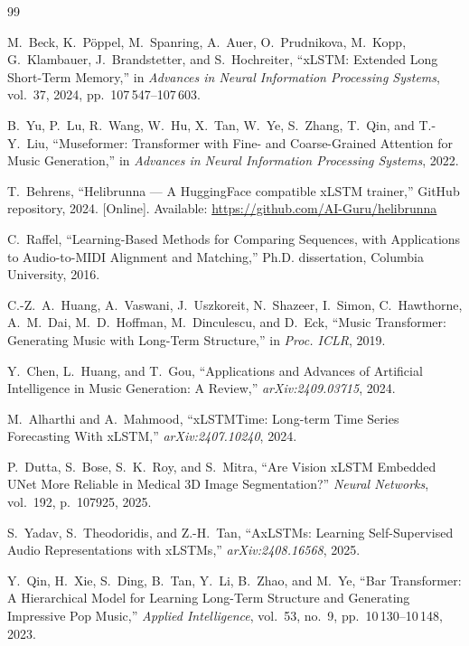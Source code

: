 \documentclass[conference]{IEEEtran}
\begin{document}

\begin{thebibliography}{99}

M.~Beck, K.~P\"{o}ppel, M.~Spanring, A.~Auer, O.~Prudnikova, M.~Kopp, G.~Klambauer, J.~Brandstetter, and S.~Hochreiter, ``xLSTM: Extended Long Short-Term Memory,'' in \emph{Advances in Neural Information Processing Systems}, vol.~37, 2024, pp.~107\,547--107\,603.

B.~Yu, P.~Lu, R.~Wang, W.~Hu, X.~Tan, W.~Ye, S.~Zhang, T.~Qin, and T.-Y.~Liu, ``Museformer: Transformer with Fine- and Coarse-Grained Attention for Music Generation,'' in \emph{Advances in Neural Information Processing Systems}, 2022.

T.~Behrens, ``Helibrunna --- A HuggingFace compatible xLSTM trainer,'' GitHub repository, 2024. [Online]. Available: \url{https://github.com/AI-Guru/helibrunna}

C.~Raffel, ``Learning-Based Methods for Comparing Sequences, with Applications to Audio-to-MIDI Alignment and Matching,'' Ph.D. dissertation, Columbia University, 2016.

C.-Z.~A.~Huang, A.~Vaswani, J.~Uszkoreit, N.~Shazeer, I.~Simon, C.~Hawthorne, A.~M.~Dai, M.~D.~Hoffman, M.~Dinculescu, and D.~Eck, ``Music Transformer: Generating Music with Long-Term Structure,'' in \emph{Proc. ICLR}, 2019.

Y.~Chen, L.~Huang, and T.~Gou, ``Applications and Advances of Artificial Intelligence in Music Generation: A Review,'' \emph{arXiv:2409.03715}, 2024.

M.~Alharthi and A.~Mahmood, ``xLSTMTime: Long-term Time Series Forecasting With xLSTM,'' \emph{arXiv:2407.10240}, 2024.

P.~Dutta, S.~Bose, S.~K.~Roy, and S.~Mitra, ``Are Vision xLSTM Embedded UNet More Reliable in Medical 3D Image Segmentation?'' \emph{Neural Networks}, vol.~192, p.~107925, 2025.

S.~Yadav, S.~Theodoridis, and Z.-H.~Tan, ``AxLSTMs: Learning Self-Supervised Audio Representations with xLSTMs,'' \emph{arXiv:2408.16568}, 2025.

Y.~Qin, H.~Xie, S.~Ding, B.~Tan, Y.~Li, B.~Zhao, and M.~Ye, ``Bar Transformer: A Hierarchical Model for Learning Long-Term Structure and Generating Impressive Pop Music,'' \emph{Applied Intelligence}, vol.~53, no.~9, pp.~10\,130--10\,148, 2023.


\end{thebibliography}
\end{document}
